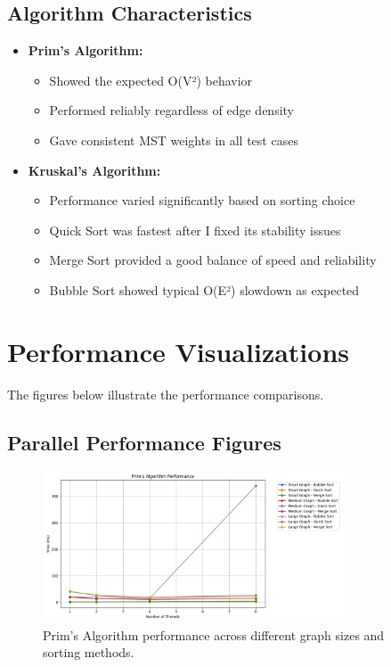 \documentclass[11pt]{article}
\begin{document}
\subsection{Algorithm Characteristics}
\begin{itemize}
    \item \textbf{Prim's Algorithm:}
    \begin{itemize}
        \item Showed the expected O(V²) behavior
        \item Performed reliably regardless of edge density
        \item Gave consistent MST weights in all test cases
    \end{itemize}
    
    \item \textbf{Kruskal's Algorithm:}
    \begin{itemize}
        \item Performance varied significantly based on sorting choice
        \item Quick Sort was fastest after I fixed its stability issues
        \item Merge Sort provided a good balance of speed and reliability
        \item Bubble Sort showed typical O(E²) slowdown as expected
    \end{itemize}
\end{itemize}

\section{Performance Visualizations}
The figures below illustrate the performance comparisons.

\subsection{Parallel Performance Figures}
\begin{figure}[H]
    \centering
    \includegraphics[width=0.8\textwidth]{prims_comparison.png}
    \caption{Prim's Algorithm performance across different graph sizes and sorting methods.}
    \label{fig:prims_comparison}
\end{figure}
\end{document}
